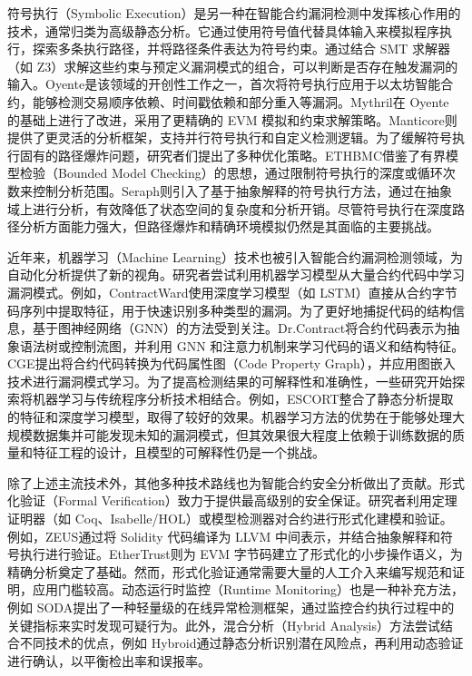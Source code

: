 \documentclass[print, master, vlined, timesmath]{DissertUESTC}
\begin{document}
符号执行（Symbolic Execution）是另一种在智能合约漏洞检测中发挥核心作用的技术，通常归类为高级静态分析。它通过使用符号值代替具体输入来模拟程序执行，探索多条执行路径，并将路径条件表达为符号约束。通过结合 SMT 求解器（如 Z3\cite{}）求解这些约束与预定义漏洞模式的组合，可以判断是否存在触发漏洞的输入。Oyente\cite{}是该领域的开创性工作之一，首次将符号执行应用于以太坊智能合约，能够检测交易顺序依赖、时间戳依赖和部分重入等漏洞。Mythril\cite{}在 Oyente 的基础上进行了改进，采用了更精确的 EVM 模拟和约束求解策略。Manticore\cite{}则提供了更灵活的分析框架，支持并行符号执行和自定义检测逻辑。为了缓解符号执行固有的路径爆炸问题，研究者们提出了多种优化策略。ETHBMC\cite{}借鉴了有界模型检验（Bounded Model Checking）的思想，通过限制符号执行的深度或循环次数来控制分析范围。Seraph\cite{}则引入了基于抽象解释的符号执行方法，通过在抽象域上进行分析，有效降低了状态空间的复杂度和分析开销。尽管符号执行在深度路径分析方面能力强大，但路径爆炸和精确环境模拟仍然是其面临的主要挑战\cite{}。

近年来，机器学习（Machine Learning）技术也被引入智能合约漏洞检测领域，为自动化分析提供了新的视角。研究者尝试利用机器学习模型从大量合约代码中学习漏洞模式。例如，ContractWard\cite{}使用深度学习模型（如 LSTM）直接从合约字节码序列中提取特征，用于快速识别多种类型的漏洞。为了更好地捕捉代码的结构信息，基于图神经网络（GNN）的方法受到关注。Dr.Contract\cite{}将合约代码表示为抽象语法树或控制流图，并利用 GNN 和注意力机制来学习代码的语义和结构特征。CGE\cite{}提出将合约代码转换为代码属性图（Code Property Graph），并应用图嵌入技术进行漏洞模式学习。为了提高检测结果的可解释性和准确性，一些研究开始探索将机器学习与传统程序分析技术相结合。例如，ESCORT\cite{}整合了静态分析提取的特征和深度学习模型，取得了较好的效果。机器学习方法的优势在于能够处理大规模数据集并可能发现未知的漏洞模式，但其效果很大程度上依赖于训练数据的质量和特征工程的设计，且模型的可解释性仍是一个挑战。

除了上述主流技术外，其他多种技术路线也为智能合约安全分析做出了贡献。形式化验证（Formal Verification）致力于提供最高级别的安全保证。研究者利用定理证明器（如 Coq、Isabelle/HOL）或模型检测器对合约进行形式化建模和验证\cite{}\cite{}。例如，ZEUS\cite{}通过将 Solidity 代码编译为 LLVM 中间表示，并结合抽象解释和符号执行进行验证。EtherTrust\cite{}则为 EVM 字节码建立了形式化的小步操作语义，为精确分析奠定了基础。然而，形式化验证通常需要大量的人工介入来编写规范和证明，应用门槛较高。动态运行时监控（Runtime Monitoring）也是一种补充方法，例如 SODA\cite{}提出了一种轻量级的在线异常检测框架，通过监控合约执行过程中的关键指标来实时发现可疑行为。此外，混合分析（Hybrid Analysis）方法尝试结合不同技术的优点，例如 Hybroid\cite{}通过静态分析识别潜在风险点，再利用动态验证进行确认，以平衡检出率和误报率。
\end{document}
